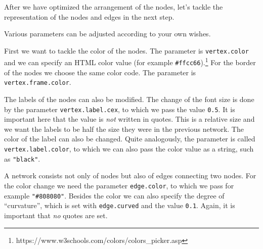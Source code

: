\documentclass[11pt]{article}
\begin{document}
After we have optimized the arrangement of the nodes, let's tackle the
representation of the nodes and edges in the next step.

Various parameters can be adjusted according to your own wishes.

First we want to tackle the color of the nodes. The parameter is
\texttt{vertex.color} and we can specify an HTML color value (for
example \texttt{\#ffcc66}).\footnote{https://www.w3schools.com/colors/colors\_picker.asp}
For the border of the nodes we choose the same color code. The parameter
is \texttt{vertex.frame.color}.

The labels of the nodes can also be modified. The change of the font
size is done by the parameter \texttt{vertex.label.cex}, to which we
pass the value \texttt{0.5}. It is important here that the value is
\emph{not} written in quotes. This is a relative size and we want the
labels to be half the size they were in the previous network. The color
of the label can also be changed. Quite analogously, the parameter is
called \texttt{vertex.label.color}, to which we can also pass the color
value as a string, such as \texttt{"black"}.

A network consists not only of nodes but also of edges connecting two
nodes. For the color change we need the parameter \texttt{edge.color},
to which we pass for example \texttt{"\#808080"}. Besides the color we
can also specify the degree of ``curvature'', which is set with
\texttt{edge.curved} and the value \texttt{0.1}. Again, it is important
that \emph{no} quotes are set.
\end{document}
